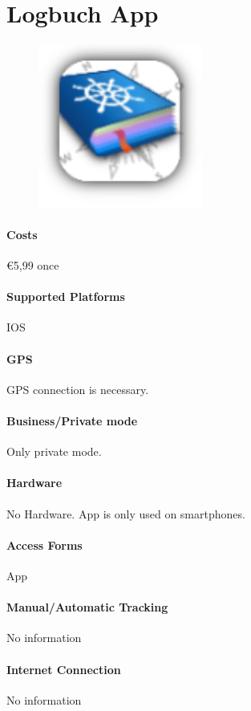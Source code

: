 \section{Logbuch App}
\begin{figure}
  \begin{center}
    \includegraphics[width=0.48\textwidth]{bilder/logbuchapp}
  \end{center}
\end{figure}
\paragraph{Costs} \euro 5,99 once
\paragraph{Supported Platforms} IOS
\paragraph{GPS} GPS connection is necessary.
\paragraph{Business/Private mode} Only private mode.
\paragraph{Hardware} No Hardware. App is only used on smartphones.
\paragraph{Access Forms} App
\paragraph{Manual/Automatic Tracking} No information
\paragraph{Internet Connection} No information
